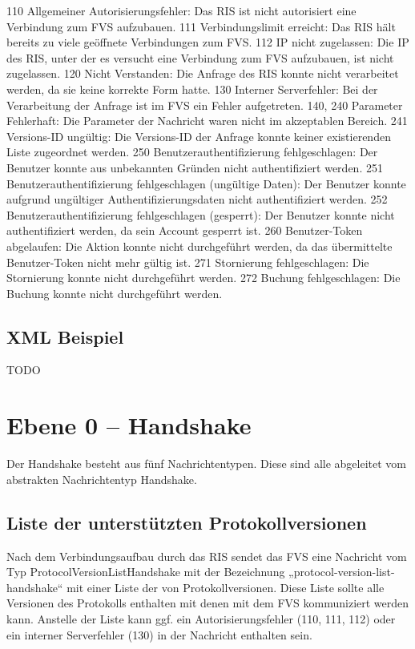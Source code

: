 110	Allgemeiner Autorisierungsfehler: Das RIS ist nicht autorisiert eine Verbindung zum FVS aufzubauen.
111	Verbindungslimit erreicht: Das RIS hält bereits zu viele geöffnete Verbindungen zum FVS.
112	IP nicht zugelassen: Die IP des RIS, unter der es versucht eine Verbindung zum FVS aufzubauen, ist nicht zugelassen.
120	Nicht Verstanden: Die Anfrage des RIS konnte nicht verarbeitet werden, da sie keine korrekte Form hatte.
130	Interner Serverfehler: Bei der Verarbeitung der Anfrage ist im FVS ein Fehler aufgetreten.
140, 240	Parameter Fehlerhaft: Die Parameter der Nachricht waren nicht im akzeptablen Bereich.
241	Versions-ID ungültig: Die Versions-ID der Anfrage konnte keiner existierenden Liste zugeordnet werden.
250	Benutzerauthentifizierung fehlgeschlagen: Der Benutzer konnte aus unbekannten Gründen nicht authentifiziert werden.
251	Benutzerauthentifizierung fehlgeschlagen (ungültige Daten): Der Benutzer konnte aufgrund ungültiger Authentifizierungsdaten nicht authentifiziert werden.
252	Benutzerauthentifizierung fehlgeschlagen (gesperrt): Der Benutzer konnte nicht authentifiziert werden, da sein Account gesperrt ist.
260	Benutzer-Token abgelaufen: Die Aktion konnte nicht durchgeführt werden, da das übermittelte Benutzer-Token nicht mehr gültig ist.
271	Stornierung fehlgeschlagen: Die Stornierung konnte nicht durchgeführt werden.
272	Buchung fehlgeschlagen: Die Buchung konnte nicht durchgeführt werden.

\subsection{XML Beispiel}
TODO

\section{Ebene 0 -- Handshake}
Der Handshake besteht aus fünf Nachrichtentypen. Diese sind alle abgeleitet vom abstrakten Nachrichtentyp Handshake.

\subsection{Liste der unterstützten Protokollversionen}
Nach dem Verbindungsaufbau durch das RIS sendet das FVS eine Nachricht vom Typ ProtocolVersionListHandshake mit der Bezeichnung „protocol-version-list-handshake“ mit einer Liste der von Protokollversionen. Diese Liste sollte alle Versionen des Protokolls enthalten mit denen mit dem FVS kommuniziert werden kann. Anstelle der Liste kann ggf. ein Autorisierungsfehler (110, 111, 112) oder ein interner Serverfehler (130) in der Nachricht enthalten sein.

